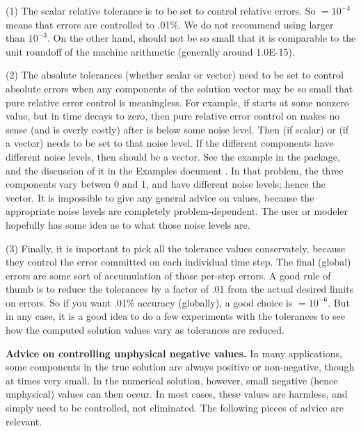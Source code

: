 (1) The scalar relative tolerance  is to be set to control relative
errors.  So  $= 10^{-4}$ means that errors are controlled to .01\%.  
We do not recommend using  larger than $10^{-3}$.  On the other hand,
 should not be so small that it is comparable to the unit roundoff
of the machine arithmetic (generally around 1.0E-15).

(2) The absolute tolerances  (whether scalar or vector) need to
be set to control absolute errors when any components of the solution
vector  may be so small that pure relative error control is
meaningless.  For example, if  starts at some nonzero value, but in time
decays to zero, then pure relative error control on  makes no sense
(and is overly costly) after  is below some noise level.  Then
 (if scalar) or  (if a vector) needs to be set to that
noise level.  If the different components have different noise levels,
then  should be a vector.  See the example  in the
{\cvodes} package, and the discussion of it in the {\cvode} Examples document
\cite{cvode_ex}.
In that problem, the three components vary betwen 0 and 1, and have
different noise levels; hence the  vector.  It is impossible to
give any general advice on  values, because the appropriate noise
levels are completely problem-dependent.  The user or modeler hopefully has
some idea as to what those noise levels are.

(3) Finally, it is important to pick all the tolerance values conservately,
because they control the error committed on each individual time step.
The final (global) errors are some sort of accumulation of those
per-step errors.  A good rule of thumb is to reduce the tolerances by a
factor of .01 from the actual desired limits on errors.  So if you
want .01\% accuracy (globally), a good choice is  $= 10^{-6}$.
But in any case, it is a good idea to do a few experiments with
the tolerances to see how the computed solution values vary as
tolerances are reduced.

\vspace{0.1in}
{\bf Advice on controlling unphysical negative values.}
In many applications, some components in the true solution are always
positive or non-negative, though at times very small.  In the numerical
solution, however, small negative (hence unphysical) values can then
occur.  In most cases, these values are harmless, and simply need to
be controlled, not eliminated. The following pieces of advice are relevant.

